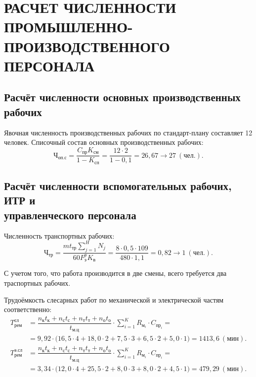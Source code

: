 \section[%
Расчёт численности промышленно-производственного персонала]{%
РАСЧЕТ ЧИСЛЕННОСТИ \\
ПРОМЫШЛЕННО-ПРОИЗВОДСТВЕННОГО \\
ПЕРСОНАЛА
}
\label{sec:number}

\subsection[%
Расчёт численности основных производственных рабочих
]{%
Расчёт численности основных производственных рабочих
}

Явочная численность производственных рабочих по стандарт-плану
составляет 12 человек.
Списочный состав основных производственных рабочих:
\begin{equation*}
  \text{Ч}_{\text{оп.с}} = 
    \dfrac{C_{\text{пр}}K_{см}}{1-K_{\text{сп}}} =
    \dfrac{12 \cdot 2}{1-0{,}1} =
    26{,}67 \rightarrow 27 \: (\text{чел.}).
\end{equation*}

\subsection[%
Расчёт численности вспомогательных рабочих, ИТР и УП
]{%
Расчёт численности вспомогательных рабочих, ИТР и \\
управленческого персонала
}

Численность транспортных рабочих:
\begin{equation*}
  \text{Ч}_{\text{тр}} = 
  \dfrac{m t_{\text{тр}} \sum^H_{j=1} N_j}{60 F^p_{\text{э}} K_{\text{в}}} =
  \dfrac{8 \cdot 0{,}5 \cdot 109}{480 \cdot 1{,}1} =
  0{,}82 \rightarrow 1 \: (\text{чел.}).
\end{equation*}

С учетом того, что работа производится в две смены, 
всего требуется два траспортных рабочих.

Трудоёмкость слесарных работ по механической и электрической частям соответственно:
{\small
\begin{align*}
  T^{\text{сл}}_{\text{рем}} &= 
  \dfrac{
    n_{\text{к}}t_{\text{к}} + n_{\text{с}}t_{\text{с}} +
    n_{\text{т}}t_{\text{т}} + n_{\text{о}}t_{\text{о}}
  }{
    t_{\text{м.ц}}
  } \cdot \sum^K_{i=1} R_{\text{м}_i} \cdot C_{\text{пр}_i} = \\
  &= 9{,}92
    \cdot
    \big(
      16{,}5 \cdot 4 + 18{,}0 \cdot 2 + 7{,}5 \cdot 3 + 
      6{,}5 \cdot 2 + 5{,}0 \cdot 1
    \big) =
    1413{,}6 \: (\text{мин}). 
  \\
  T^{\text{э.сл}}_{\text{рем}} &= 
  \dfrac{
    n_{\text{к}}t_{\text{к}} + n_{\text{с}}t_{\text{с}} +
    n_{\text{т}}t_{\text{т}} + n_{\text{о}}t_{\text{о}}
  }{
    t_{\text{м.ц}}
  } \cdot \sum^K_{i=1} R_{\text{м}_i} \cdot C_{\text{пр}_i} = \\
  &= 3{,}34
    \cdot
    \big(
      12{,}0 \cdot 4 + 25{,}5 \cdot 2 + 8{,}0 \cdot 3 + 
      8{,}0 \cdot 2 + 4{,}5 \cdot 1
    \big) =
    479{,}29 \: (\text{мин}).
\end{align*}
}

